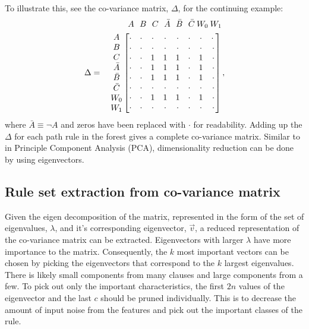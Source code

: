 \documentclass[10pt]{article}
\begin{document}
To illustrate this, see the co-variance matrix, $\Delta$, for the continuing example:
\begin{align*}
&\;\:A\:\:\:B\:\:\:C\:\:\:\bar{A}\:\:\:\bar{B}\:\:\:\bar{C}\:W_0\:W_1\\
\Delta = \quad \mqty{A\\B\\C\\\bar{A}\\\bar{B}\\\bar{C}\\W_0\\W_1}\, &\mqty[\cdot&\cdot&\cdot&\cdot&\cdot&\cdot&\cdot&\cdot\:\\\cdot&\cdot&\cdot&\cdot&\cdot&\cdot&\cdot&\cdot\\\cdot&\cdot&1&1&1&\cdot&1&\cdot\\\cdot&\cdot&1&1&1&\cdot&1&\cdot\\\cdot&\cdot&1&1&1&\cdot&1&\cdot\\\cdot&\cdot&\cdot&\cdot&\cdot&\cdot&\cdot&\cdot\\\cdot&\cdot&1&1&1&\cdot&1&\cdot\\\cdot&\cdot&\cdot&\cdot&\cdot&\cdot&\cdot&\cdot] \, ,
\end{align*}
where $\bar{A} \equiv \neg A$ and zeros have been replaced with $\cdot$ for readability. Adding up the $\Delta$ for each path rule in the forest gives a complete co-variance matrix. Similar to in Principle Component Analysis (PCA), dimensionality reduction can be done by using eigenvectors.

\subsection{Rule set extraction from co-variance matrix}
Given the eigen decomposition of the matrix, represented in the form of the set of eigenvalues, $\lambda$, and it's corresponding eigenvector, $\vec{v}$, a reduced representation of the co-variance matrix can be extracted. Eigenvectors with larger $\lambda$ have more importance to the matrix. Consequently, the $k$ most important vectors can be chosen by picking the eigenvectors that correspond to the $k$ largest eigenvalues. There is likely small components from many clauses and large components from a few. To pick out only the important characteristics, the first $2n$ values of the eigenvector and the last $c$ should be pruned individually. This is to decrease the amount of input noise from the features and pick out the important classes of the rule. 
\end{document}
